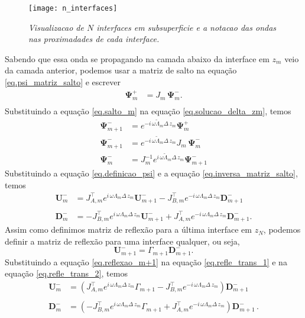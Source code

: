 \begin{figure}
\centering
\texttt{[image: n\_interfaces]}
\caption{\textit{Visualizacao de $N$ interfaces em subsuperficie e a notacao das ondas nas proximadades de cada interface.}}
\label{fig.N_interfaces}
\end{figure}

Sabendo que essa onda se propagando na camada abaixo da interface em $z_m$ veio da camada anterior, podemos usar a matriz de salto na equa\c{c}\~ao \ref{eq.psi_matriz_salto} e escrever
\begin{align}\label{eq.salto_m}
\mathbf{\Psi}^+_{m}&=J_m\,\mathbf{\Psi}^-_m.\\
\end{align}
Substituindo a equa\c{c}\~ao \ref{eq.salto_m} na equa\c{c}\~ao \ref{eq.solucao_delta_zm}, temos
\begin{align*}
\mathbf{\Psi}^-_{m+1}&=e^{-i\,\omega\tilde{\Lambda}_m\Delta\,z_m}\mathbf{\Psi}^+_m\\
\mathbf{\Psi}^-_{m+1}&=e^{-i\,\omega\tilde{\Lambda}_m\Delta\,z_m}J_m\,\mathbf{\Psi}^-_m\\
\mathbf{\Psi}^-_m&=J^{-1}_me^{i\,\omega\tilde{\Lambda}_m\Delta\,z_m}\mathbf{\Psi}^-_{m+1}
\end{align*}
Substituindo a equa\c{c}\~ao \ref{eq.definicao_psi} e a equa\c{c}\~ao \ref{eq.inversa_matriz_salto}, temos
\begin{align}\label{eq.refle_trans_1}
\mathbf{U}_m^-&=J^\top_{A,m}e^{i\,\omega\Lambda_m\Delta\,z_m}\mathbf{U}^-_{m+1}-J^\top_{B,m}e^{-i\,\omega\Lambda_m\Delta\,z_m}\mathbf{D}^-_{m+1}\\\nonumber\\\label{eq.refle_trans_2}
\mathbf{D}_m^-&=-J^\top_{B,m}e^{i\,\omega\Lambda_m\Delta\,z_m}\mathbf{U}^-_{m+1}+J^\top_{A,m}e^{-i\,\omega\Lambda_m\Delta\,z_m}\mathbf{D}^-_{m+1}.
\end{align}
Assim como definimos matriz de reflex\~ao para a \'ultima interface em $z_N$, podemos definir a matriz de reflex\~ao para uma interface qualquer, ou seja,
\begin{equation}\label{eq.reflexao_m+1}
\mathbf{U}^-_{m+1}=\Gamma_{m+1}\mathbf{D}^-_{m+1}.
\end{equation}
Substituindo a equa\c{c}\~ao \ref{eq.reflexao_m+1} na equa\c{c}\~ao \ref{eq.refle_trans_1} e na equa\c{c}\~ao \ref{eq.refle_trans_2}, temos
\begin{align}\label{eq.refle_trans_3}
\mathbf{U}_m^-&=(J^\top_{A,m}e^{i\,\omega\Lambda_m\Delta\,z_m}\Gamma_{m+1}-J^\top_{B,m}e^{-i\,\omega\Lambda_m\Delta\,z_m})\mathbf{D}^-_{m+1}\\\nonumber\\\label{eq.refle_trans_4}
\mathbf{D}_m^-&=(-J^\top_{B,m}e^{i\,\omega\Lambda_m\Delta\,z_m}\Gamma_{m+1}+J^\top_{A,m}e^{-i\,\omega\Lambda_m\Delta\,z_m})\mathbf{D}^-_{m+1}\,.
\end{align}
